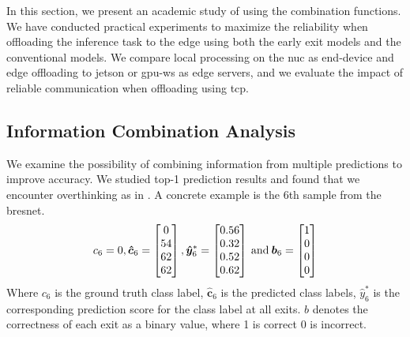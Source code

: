In this section, we present an academic study of using the combination functions. We have conducted practical experiments to maximize the reliability when offloading the inference task to the edge using both the early exit models and the conventional models. We compare local processing on the \gls{nuc} as end-device and edge offloading to \gls{jetson} or \gls{gpu-ws} as edge servers, and we evaluate the impact of reliable communication when offloading using \gls{tcp}. 

\subsection{Information Combination Analysis}

We examine the possibility of combining information from multiple predictions to improve accuracy. We studied top-1 prediction results and found that we encounter overthinking as in \cite{kaya_shallow-deep_nodate}. A concrete example is the 6th sample from the \gls{bresnet}.
\begin{align*}
c_6=0,
\bm{\hat{c}}_{6}=
\begin{bmatrix}
0 \\
54 \\
62 \\
62
\end{bmatrix},
\bm{\hat{y}}^{*}_{6}=
\begin{bmatrix}
0.56 \\
0.32 \\
0.52 \\
0.62
\end{bmatrix} \text{\:and\:}
\bm{b}_{6}=
\begin{bmatrix}
1 \\
0 \\
0 \\
0
\end{bmatrix}
\end{align*}
Where $ c_6 $ is the ground truth class label, $ \bm{\hat{c}}_6 $ is the predicted class labels, $ \hat{y}^*_6 $ is the corresponding prediction score for the class label at all exits. $ b $ denotes the correctness of each exit as a binary value, where 1 is correct 0 is incorrect.


